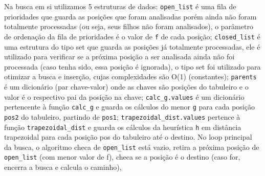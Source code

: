 \documentclass[12pt]{article}
\begin{document}
Na busca em si utilizamos 5 estruturas de dados: \verb|open_list| é uma fila de prioridades que guarda as posições que foram analisadas porém ainda não foram totalmente processadas (ou seja, seus filhos não foram analisados), o parâmetro de ordenação da fila de prioridades é o valor de \verb|f| de cada posição; \verb|closed_list| é uma estrutura do tipo set que guarda as posições já totalmente processadas, ele é utilizado para verificar se a próxima posição a ser analisada ainda não foi processada (caso tenha sido, essa posição é ignorada), o tipo set foi utilizado para otimizar a busca e inserção, cujas complexidades são O(1) (constantes); \verb|parents| é um dicionário (par chave-valor) onde as chaves são posições do tabuleiro e o valor é o respectivo pai da posição na chave; \verb|calc_g.values| é um dicionário pertencente à função \verb|calc_g| e guarda os cálculos do menor \verb|g| para cada posição \verb|pos2| do tabuleiro, partindo de \verb|pos1|; \verb|trapezoidal_dist.values| pertence à função \verb|trapezoidal_dist| e guarda os cálculos da heurística \verb|h| em distância trapezoidal para cada posição pos do tabuleiro até o destino. No loop principal da busca, o algoritmo checa de \verb|open_list| está vazio, retira a próxima posição de \verb|open_list| (com menor valor de f), checa se a posição é o destino (caso for, encerra a busca e calcula o caminho),
\end{document}

